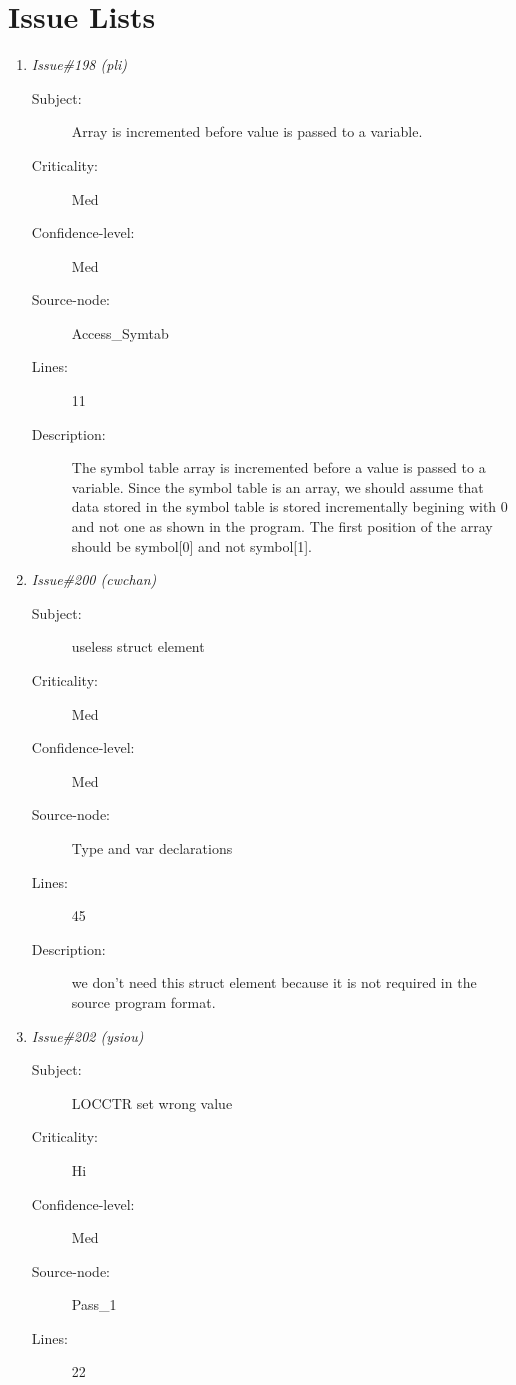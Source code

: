 \section{Issue Lists}
\begin{enumerate}
\item {\it Issue\#198 (pli)}
\begin{description}
\item [Subject:] Array is incremented before value is passed to a
         variable.
\item [Criticality:] Med
\item [Confidence-level:] Med
\item [Source-node:] Access\_Symtab

\item [Lines:] 11

\item [Description:] The symbol table array is incremented before
a value is passed to a variable.  Since the symbol table is an array, we
should assume that data stored in the symbol table is stored incrementally
begining with 0 and not one as shown in the program.  The first position of
the array should be symbol[0] and not symbol[1].
\end{description}
\item {\it Issue\#200 (cwchan)}
\begin{description}
\item [Subject:] useless struct element
\item [Criticality:] Med
\item [Confidence-level:] Med
\item [Source-node:] Type and var declarations

\item [Lines:] 45

\item [Description:] we don't need this struct element because it
is not required in the source program format.
\end{description}
\item {\it Issue\#202 (ysiou)}
\begin{description}
\item [Subject:] LOCCTR set wrong value
\item [Criticality:] Hi
\item [Confidence-level:] Med
\item [Source-node:] Pass\_1

\item [Lines:] 22


\end{description}
\end{enumerate}
